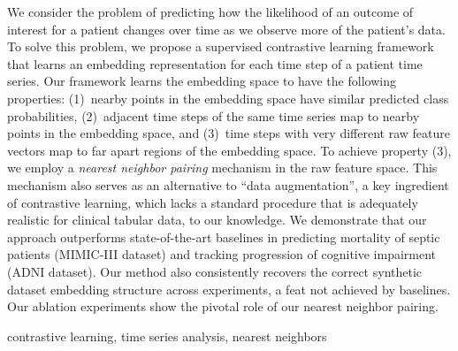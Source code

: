 \begin{ChTwoAbstract}
We consider the problem of predicting how the likelihood of an outcome of interest for a patient changes over time as we observe more of the patient's data.
To solve this problem, we propose a supervised contrastive learning framework
that learns an embedding representation for each time step of a patient time series.
Our framework learns the embedding space to have the following properties:
(1)~nearby points in the embedding space have similar predicted class probabilities,
(2)~adjacent time steps of the same time series map to nearby points in the embedding space,
and (3)~time steps with very different raw feature vectors map to far apart regions of the embedding space.
To achieve property (3), we employ a \emph{nearest neighbor pairing} mechanism in the raw feature space. 
This mechanism also serves as an alternative to ``data augmentation'', a key ingredient of contrastive learning, which lacks a standard procedure that is adequately realistic for clinical tabular data, to our knowledge.
We demonstrate that our approach outperforms state-of-the-art baselines in predicting mortality of septic patients (MIMIC-III dataset) and tracking progression of cognitive impairment (ADNI dataset). Our method also consistently recovers the correct synthetic dataset embedding structure across experiments, a feat not achieved by baselines. 
Our ablation experiments show the pivotal role of our nearest neighbor pairing.
\end{ChTwoAbstract}
\begin{ChTwoKeywords}
contrastive learning, time series analysis, nearest neighbors
\end{ChTwoKeywords}




 


